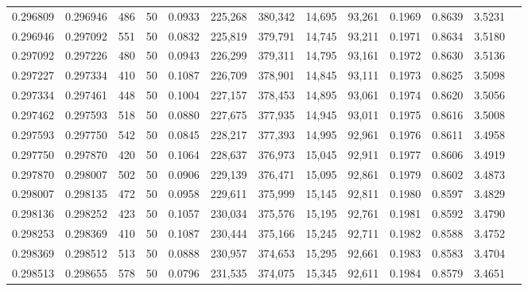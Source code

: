 \begin{tabular}{rrrrrrrrrrrrr}
0.296809 & 0.296946 &   486 &  50 &                                     0.0933 & 225,268 & 380,342 &  14,695 &  93,261 & 0.1969 & 0.8639 & 3.5231 \\
0.296946 & 0.297092 &   551 &  50 &                                     0.0832 & 225,819 & 379,791 &  14,745 &  93,211 & 0.1971 & 0.8634 & 3.5180 \\
0.297092 & 0.297226 &   480 &  50 &                                     0.0943 & 226,299 & 379,311 &  14,795 &  93,161 & 0.1972 & 0.8630 & 3.5136 \\
0.297227 & 0.297334 &   410 &  50 &                                     0.1087 & 226,709 & 378,901 &  14,845 &  93,111 & 0.1973 & 0.8625 & 3.5098 \\
0.297334 & 0.297461 &   448 &  50 &                                     0.1004 & 227,157 & 378,453 &  14,895 &  93,061 & 0.1974 & 0.8620 & 3.5056 \\
0.297462 & 0.297593 &   518 &  50 &                                     0.0880 & 227,675 & 377,935 &  14,945 &  93,011 & 0.1975 & 0.8616 & 3.5008 \\
0.297593 & 0.297750 &   542 &  50 &                                     0.0845 & 228,217 & 377,393 &  14,995 &  92,961 & 0.1976 & 0.8611 & 3.4958 \\
0.297750 & 0.297870 &   420 &  50 &                                     0.1064 & 228,637 & 376,973 &  15,045 &  92,911 & 0.1977 & 0.8606 & 3.4919 \\
0.297870 & 0.298007 &   502 &  50 &                                     0.0906 & 229,139 & 376,471 &  15,095 &  92,861 & 0.1979 & 0.8602 & 3.4873 \\
0.298007 & 0.298135 &   472 &  50 &                                     0.0958 & 229,611 & 375,999 &  15,145 &  92,811 & 0.1980 & 0.8597 & 3.4829 \\
0.298136 & 0.298252 &   423 &  50 &                                     0.1057 & 230,034 & 375,576 &  15,195 &  92,761 & 0.1981 & 0.8592 & 3.4790 \\
0.298253 & 0.298369 &   410 &  50 &                                     0.1087 & 230,444 & 375,166 &  15,245 &  92,711 & 0.1982 & 0.8588 & 3.4752 \\
0.298369 & 0.298512 &   513 &  50 &                                     0.0888 & 230,957 & 374,653 &  15,295 &  92,661 & 0.1983 & 0.8583 & 3.4704 \\
0.298513 & 0.298655 &   578 &  50 &                                     0.0796 & 231,535 & 374,075 &  15,345 &  92,611 & 0.1984 & 0.8579 & 3.4651 \\

\end{tabular}
